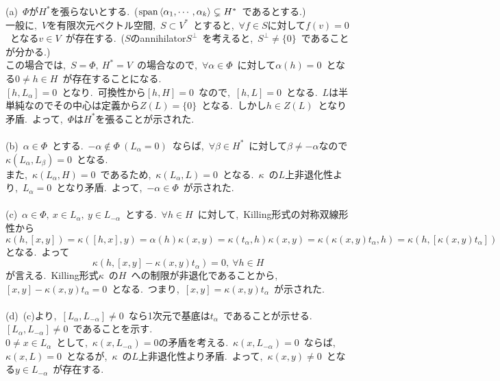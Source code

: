 \documentclass[uplatex,dvipdfmx]{jsarticle}
\begin{document}
\begin{myproof}
    (a)~$\Phi$が$H^*$を張らないとする.~($\text{span}\ev{\alpha_1, \cdots, \alpha_k} \subsetneq H^*$~であるとする.)\\
    一般に,~$V$を有限次元ベクトル空間,~$S \subset V^*$~とすると,~$\forall f \in S$に対して$f(v) = 0$~となる$v \in V$~が存在する.~($S$のannihilator$S ^\perp$~を考えると,~$S^\perp \neq \{0\}$~であることが分かる.)\\
    この場合では,~$S = \Phi,~H^* = V$~の場合なので,~$\forall \alpha \in \Phi$~に対して$\alpha(h) = 0$~となる$0 \neq h \in H$~が存在することになる.~\\
    $[h,L_\alpha] = 0$~となり.~可換性から$[h,H] = 0$~なので,~$[h,L] = 0$~となる.~$L$は半単純なのでその中心は定義から$Z(L) = \{0\}$~となる.~しかし$h \in Z(L)$~となり矛盾.~よって,~$\Phi$は$H^*$を張ることが示された.\\\\
    (b)~$\alpha \in \Phi$~とする.~$-\alpha \notin \Phi~(L_\alpha = 0)$~ならば,~$\forall \beta \in H^*$~に対して$\beta \neq -\alpha$なので $\kappa(L_\alpha, L_\beta) = 0$~となる.\\
    また,~$\kappa(L_\alpha, H) = 0$~であるため,~$\kappa(L_\alpha, L) = 0$~となる.~$\kappa$~の$L$上非退化性より,~$L_\alpha = 0$~となり矛盾.~よって,~$-\alpha \in \Phi$~が示された.\\\\
    (c)~$\alpha \in \Phi,~x\in L_\alpha,~y\in L_{-\alpha}$~とする.~$\forall h \in H$~に対して,~Killing形式の対称双線形性から
    \begin{equation*}
        \kappa(h,[x,y]) = \kappa([h,x],y) = \alpha(h)\kappa(x,y) = \kappa(t_\alpha, h)\kappa(x,y) = \kappa(\kappa(x,y)t_\alpha, h) = \kappa(h,[\kappa(x,y)t_\alpha])
    \end{equation*}
    となる.~よって
    \begin{equation*}
        \kappa(h,[x,y] - \kappa(x,y)t_\alpha) = 0,~\forall h \in H
    \end{equation*}
    が言える.~Killing形式$\kappa$~の$H$~への制限が非退化であることから,~$[x,y] - \kappa(x,y)t_\alpha = 0$~となる.~つまり,~$[x,y] = \kappa(x,y) t_\alpha$~が示された.\\\\
    (d)~(c)より,~$[L_\alpha, L_{-\alpha}] \neq 0$~なら1次元で基底は$t_\alpha$~であることが示せる.~$[L_\alpha,L_{-\alpha}] \neq 0$~であることを示す.\\
    $0\neq x \in L_\alpha$~として,~$\kappa(x,L_{-\alpha}) =0$の矛盾を考える.~$\kappa(x,L_{-\alpha}) = 0$~ならば,~$\kappa(x,L) = 0$~となるが,~$\kappa$~の$L$上非退化性より矛盾.~よって,~$\kappa(x,y) \neq 0$~となる$y \in L_{-\alpha}$~が存在する.\\

\end{myproof}
\end{document}
